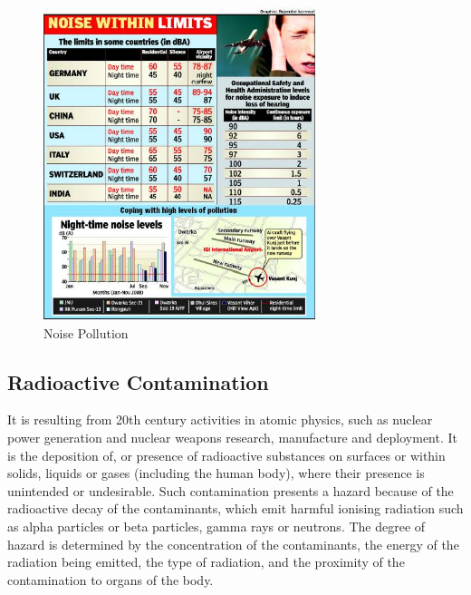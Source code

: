 
\begin{figure}[h]
\centering
  \includegraphics[width=80mm]{noise.jpg}
  \caption{Noise Pollution}
  \label{fig:Noise Pollution}
\end{figure}


\subsection{Radioactive Contamination}
It is resulting from 20th century activities in atomic physics, such as nuclear power generation and nuclear weapons research, manufacture and deployment. It is the deposition of, or presence of radioactive substances on surfaces or within solids, liquids or gases (including the human body), where their presence is unintended or undesirable. Such contamination presents a hazard because of the radioactive decay of the contaminants, which emit harmful ionising radiation such as alpha particles or beta particles, gamma rays or neutrons. The degree of hazard is determined by the concentration of the contaminants, the energy of the radiation being emitted, the type of radiation, and the proximity of the contamination to organs of the body.

